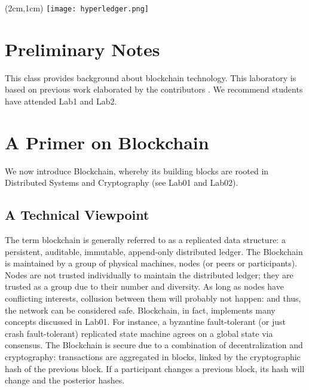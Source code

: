 \documentclass[12pt,a4paper]{article}
\theoremstyle{definition}
\begin{document}
\textblockorigin{-34pt}{-12pt}
\begin{textblock*}{10cm}(2cm,1cm)
\texttt{[image: hyperledger.png]}
\end{textblock*}

\section*{Preliminary Notes}
This class provides background about blockchain technology. This laboratory is based on previous work elaborated by the contributors \cite{belchior2019_audits,belchior2020,belchior2019_thesis}. We recommend students have attended Lab1 and Lab2.






\section{A Primer on Blockchain}
We now introduce Blockchain, whereby its building blocks are rooted in Distributed Systems and Cryptography (see Lab01 and Lab02).



\subsection{A Technical Viewpoint}
The term blockchain is generally referred to as a replicated data structure: a persistent, auditable, immutable, append-only distributed ledger. The Blockchain is maintained by a group of physical machines, nodes (or peers or participants). Nodes are not trusted individually to maintain the distributed ledger; they are trusted as a group due to their number and diversity. As long as nodes have conflicting interests, collusion between them will probably not happen: and thus, the network can be considered safe. Blockchain, in fact, implements many concepts discussed in Lab01. For instance, a byzantine fault-tolerant (or just crash fault-tolerant) replicated state machine agrees on a global state via consensus. The Blockchain is secure due to a combination of decentralization and cryptography: transactions are aggregated in blocks, linked by the cryptographic hash of the previous block. If a participant changes a previous block, its hash will change and the posterior hashes.
\end{document}

